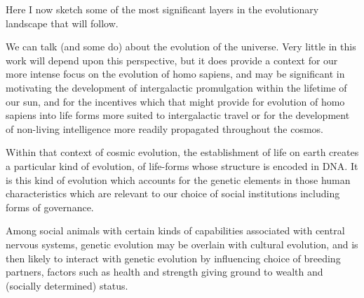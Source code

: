 Here I now sketch some of the most significant layers in the evolutionary landscape that will follow.

We can talk (and some do) about the evolution of the universe.
Very little in this work will depend upon this perspective, but it does provide a context for our more intense focus on the evolution of homo sapiens, and may be significant in motivating the development of intergalactic promulgation within the lifetime of our sun, and for the incentives which that might provide for evolution of homo sapiens into life forms more suited to intergalactic travel or for the development of non-living intelligence more readily propagated throughout the cosmos.

Within that context of cosmic evolution, the establishment of life on earth creates a particular kind of evolution, of life-forms whose structure is encoded in DNA.
It is this kind of evolution which accounts for the genetic elements in those human characteristics which are relevant to our choice of social institutions including forms of governance.

Among social animals with certain kinds of capabilities associated with central nervous systems, genetic evolution may be overlain with cultural evolution, and is then likely to interact with genetic evolution by influencing choice of breeding partners, factors such as health and strength giving ground to wealth and (socially determined) status.

